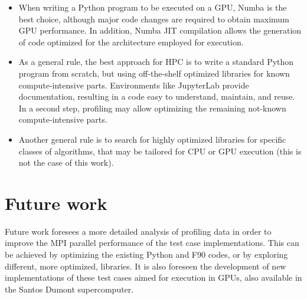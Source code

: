 \begin{itemize}
\item When writing a Python program to be executed on a GPU, Numba is the best choice, although major code changes are required to obtain maximum GPU performance. In addition, Numba JIT compilation allows the generation of code optimized for the architecture employed for execution.

\item As a general rule, the best approach for HPC is to write a standard Python program from scratch, but using off-the-shelf optimized libraries for known compute-intensive parts. Environments like JupyterLab provide documentation, resulting in a code easy to understand, maintain, and reuse. In a second step, profiling may allow optimizing the remaining not-known compute-intensive parts.

\item Another general rule is to search for highly optimized libraries for specific classes of algorithms, that may be tailored for CPU or GPU execution (this is not the case of this work).

\end{itemize}

%
%
%
\section{Future work}

Future work foresees a more detailed analysis of profiling data in order to improve the MPI parallel performance of the test case implementations. This can be achieved by optimizing the existing Python and F90 codes, or by exploring different, more optimized, libraries. It is also foreseen the development of new implementations of these test cases aimed for execution in GPUs, also available in the Santos Dumont supercomputer. 
